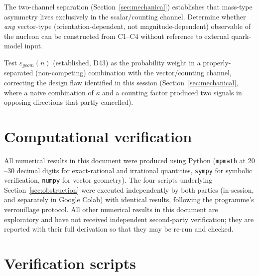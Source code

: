 \documentclass[11pt]{article}
\begin{document}
\begin{openproblembox}[OP-D66-3]
The two-channel separation (Section~\ref{sec:mechanical}) establishes that mass-type asymmetry lives exclusively in the scalar/counting channel. Determine whether \emph{any} vector-type (orientation-dependent, not magnitude-dependent) observable of the nucleon can be constructed from C1--C4 without reference to external quark-model input.
\end{openproblembox}

\begin{openproblembox}[OP-D66-4]
Test $\varepsilon_{geom}(n)$ (established, D43) as the probability weight in a properly-separated (non-competing) combination with the vector/counting channel, correcting the design flaw identified in this session (Section~\ref{sec:mechanical}, where a naive combination of $\kappa$ and a counting factor produced two signals in opposing directions that partly cancelled).
\end{openproblembox}

\section{Computational verification}
All numerical results in this document were produced using Python (\texttt{mpmath} at $20$--$30$ decimal digits for exact-rational and irrational quantities, \texttt{sympy} for symbolic verification, \texttt{numpy} for vector geometry). The four scripts underlying Section~\ref{sec:obstruction} were executed independently by both parties (in-session, and separately in Google Colab) with identical results, following the programme's verrouillage protocol. All other numerical results in this document are exploratory and have not received independent second-party verification; they are reported with their full derivation so that they may be re-run and checked.

\clearpage




\clearpage

\appendix
\section{Verification scripts}
\label{app:scripts}
\end{document}
